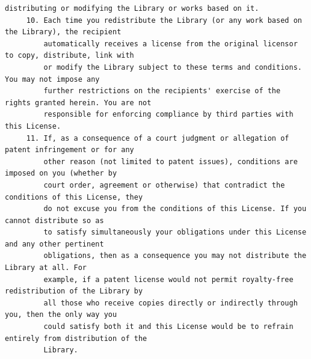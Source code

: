 \begin{lstlisting}[basicstyle=\ttfamily\footnotesize,breaklines=true]
         distributing or modifying the Library or works based on it.
     10. Each time you redistribute the Library (or any work based on the Library), the recipient
         automatically receives a license from the original licensor to copy, distribute, link with
         or modify the Library subject to these terms and conditions. You may not impose any
         further restrictions on the recipients' exercise of the rights granted herein. You are not
         responsible for enforcing compliance by third parties with this License.
     11. If, as a consequence of a court judgment or allegation of patent infringement or for any
         other reason (not limited to patent issues), conditions are imposed on you (whether by
         court order, agreement or otherwise) that contradict the conditions of this License, they
         do not excuse you from the conditions of this License. If you cannot distribute so as
         to satisfy simultaneously your obligations under this License and any other pertinent
         obligations, then as a consequence you may not distribute the Library at all. For
         example, if a patent license would not permit royalty-free redistribution of the Library by
         all those who receive copies directly or indirectly through you, then the only way you
         could satisfy both it and this License would be to refrain entirely from distribution of the
         Library.





\end{lstlisting}
